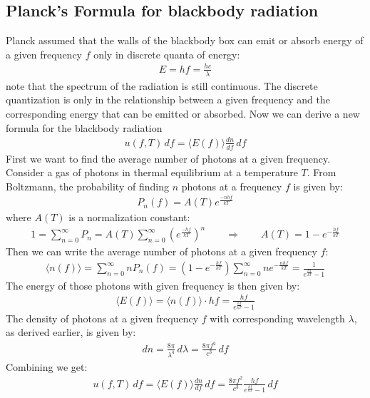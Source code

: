 \documentclass[11pt]{article}
\theoremstyle{break}
\theoremstyle{break}
\begin{document}
\subsection{Planck's Formula for blackbody radiation}
Planck assumed that the walls of the blackbody box can emit or absorb energy of a given frequency $f$ only in discrete quanta of energy:
\begin{align*}
E = hf = \frac{hc}{\lambda} \tag{Planck's Relation}
\end{align*}
note that the spectrum of the radiation is still continuous. The discrete quantization is only in the relationship between a given frequency and the corresponding energy that can be emitted or absorbed. Now we can derive a new formula for the blackbody radiation
\begin{align*}
u(f,T) \, df = \langle E(f) \rangle \frac{dn}{df}\, df
\end{align*}
First we want to find the average number of photons at a given frequency. Consider a gas of photons in thermal equilibrium at a temperature $T$. From Boltzmann, the probability of finding $n$ photons at a frequency $f$ is given by:
\begin{align*}
P_n(f) = A(T) e^{\frac{-nhf}{kT}}
\end{align*}
where $A(T)$ is a normalization constant:
\begin{align*}
1 = \sum_{n=0}^\infty P_n = A(T) \sum_{n=0}^\infty \left(e^{\frac{-hf}{kT}}\right)^n\qquad \Rightarrow\qquad A(T) = 1-e^{-\frac{hf}{kT}}
\end{align*}
Then we can write the average number of photons at a given frequency $f$:
\begin{align*}
\langle n(f) \rangle = \sum_{n=0}^\infty n P_n(f) = (1-e^{-\frac{hf}{kT}}) \sum_{n=0}^\infty n e^{-\frac{nhf}{kT}} = \frac{1}{e^{\frac{hf}{kT}}-1}
\end{align*}
The energy of those photons with given frequency is then given by:
\begin{align*}
\langle E(f) \rangle = \langle n(f) \rangle \cdot hf = \frac{hf}{e^{\frac{hf}{kT}}-1}
\end{align*}
The density of photons at a given frequency $f$ with corresponding wavelength $\lambda$, as derived earlier, is given by:
\begin{align*}
dn =\frac{8\pi}{\lambda^4}\, d\lambda = \frac{8\pi f^2}{c^3}\, df
\end{align*}
Combining we get:
\begin{align}
u(f,T) \, df = \langle E(f) \rangle \frac{dn}{df} \, df = \frac{8\pi f^2}{c^3}\frac{hf}{e^{\frac{hf}{kT}}-1}\, df \tag{UP}
\end{align}
\end{document}
